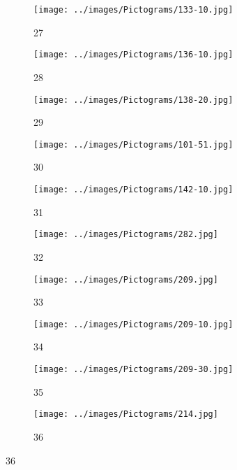 \begin{figure}[H]
\begin{subfigure}[b]{0.1\textwidth}
\centering
\texttt{[image: ../images/Pictograms/133-10.jpg]}
\caption{27}
\end{subfigure}
\hspace{3em}%
\begin{subfigure}[b]{0.1\textwidth}
 \centering
 \texttt{[image: ../images/Pictograms/136-10.jpg]}
 \caption{28}
\end{subfigure}
\hspace{3em}%
\begin{subfigure}[b]{0.1\textwidth}
 \centering
 \texttt{[image: ../images/Pictograms/138-20.jpg]}
 \caption{29}
\end{subfigure}
\hspace{3em}%
\begin{subfigure}[b]{0.1\textwidth}
 \centering
 \texttt{[image: ../images/Pictograms/101-51.jpg]}
 \caption{30}
\end{subfigure}
\hspace{3em}%
\begin{subfigure}[b]{0.1\textwidth}
\centering
\texttt{[image: ../images/Pictograms/142-10.jpg]}
\caption{31}
\end{subfigure}
\hspace{3em}%
\begin{subfigure}[b]{0.1\textwidth}
\centering
\texttt{[image: ../images/Pictograms/282.jpg]}
\caption{32}
\end{subfigure}
\hspace{3em}%
\begin{subfigure}[b]{0.1\textwidth}
\centering
\texttt{[image: ../images/Pictograms/209.jpg]}
\caption{33}
\end{subfigure}
\hspace{3em}%
\begin{subfigure}[b]{0.1\textwidth}
\centering
\texttt{[image: ../images/Pictograms/209-10.jpg]}
\caption{34}
\end{subfigure}
\hspace{3em}%
\begin{subfigure}[b]{0.1\textwidth}
\centering
\texttt{[image: ../images/Pictograms/209-30.jpg]}
\caption{35}
\end{subfigure}
\hspace{3em}%
\begin{subfigure}[b]{0.1\textwidth}
\centering
\texttt{[image: ../images/Pictograms/214.jpg]}
\caption{36}

\end{subfigure}
\end{figure}
